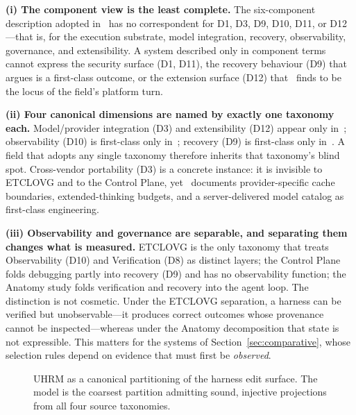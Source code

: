 \documentclass[conference]{IEEEtran}
\begin{document}
\textbf{(i) The component view is the least complete.} The six-component description adopted in~\cite{b2} has no correspondent for D1, D3, D9, D10, D11, or D12---that is, for the execution substrate, model integration, recovery, observability, governance, and extensibility. A system described only in component terms cannot express the security surface (D1, D11), the recovery behaviour (D9) that~\cite{b7} argues is a first-class outcome, or the extension surface (D12) that~\cite{b1} finds to be the locus of the field's platform turn.

\textbf{(ii) Four canonical dimensions are named by exactly one taxonomy each.} Model/provider integration (D3) and extensibility (D12) appear only in~\cite{b1}; observability (D10) is first-class only in~\cite{b2}; recovery (D9) is first-class only in~\cite{b7}. A field that adopts any single taxonomy therefore inherits that taxonomy's blind spot. Cross-vendor portability (D3) is a concrete instance: it is invisible to ETCLOVG and to the Control Plane, yet~\cite{b1} documents provider-specific cache boundaries, extended-thinking budgets, and a server-delivered model catalog as first-class engineering.

\textbf{(iii) Observability and governance are separable, and separating them changes what is measured.} ETCLOVG is the only taxonomy that treats Observability (D10) and Verification (D8) as distinct layers; the Control Plane folds debugging partly into recovery (D9) and has no observability function; the Anatomy study folds verification and recovery into the agent loop. The distinction is not cosmetic. Under the ETCLOVG separation, a harness can be verified but unobservable---it produces correct outcomes whose provenance cannot be inspected---whereas under the Anatomy decomposition that state is not expressible. This matters for the systems of Section~\ref{sec:comparative}, whose selection rules depend on evidence that must first be \emph{observed}.

\begin{figure}[t]
\centering
{}
\caption{UHRM as a canonical partitioning of the harness edit surface. The model is the coarsest partition admitting sound, injective projections from all four source taxonomies.}
\label{fig:uhrm}
\end{figure}
\end{document}
